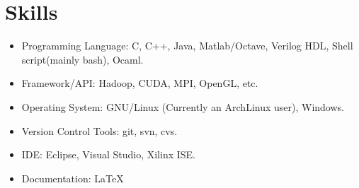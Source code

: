\documentclass[letterpaper]{article}
\begin{document}
\section*{Skills}
\begin{itemize}
\item Programming Language: C, C++, Java, Matlab/Octave, Verilog HDL, Shell script(mainly bash), Ocaml.
\item Framework/API: Hadoop, CUDA, MPI, OpenGL, etc.
\item Operating System: GNU/Linux (Currently an ArchLinux user), Windows.
\item Version Control Tools: git, svn, cvs.
\item IDE: Eclipse, Visual Studio, Xilinx ISE.
\item Documentation: \LaTeX
\end{itemize}
\end{document}
